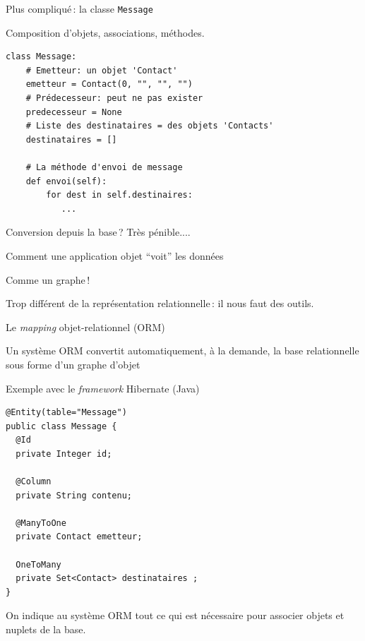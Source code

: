 \begin{frame}[fragile]{Plus compliqué\,: la classe  \texttt{Message}}

Composition d'objets,  associations, méthodes.

\vfill

\vfill

\begin{verbatim}
class Message:
    # Emetteur: un objet 'Contact'
    emetteur = Contact(0, "", "", "")
    # Prédecesseur: peut ne pas exister
    predecesseur = None
    # Liste des destinataires = des objets 'Contacts'
    destinataires = []

    # La méthode d'envoi de message
    def envoi(self):
        for dest in self.destinaires:
           ...
\end{verbatim}

\vfill

Conversion depuis la base\,? Très pénible....
\end{frame}

\begin{frame}{Comment une application objet ``voit'' les données}

Comme un graphe\,!

\vfill

\vfill


\vfill
Trop différent de la représentation relationnelle\,: il nous faut des outils.

\end{frame}


\begin{frame}{Le \textit{mapping} objet-relationnel (ORM)}

Un système ORM convertit \alert{automatiquement}, 
\alert{à la demande}, la base relationnelle sous forme d’un graphe d’objet

\vfill


\end{frame}

\begin{frame}[fragile]{Exemple avec le \textit{framework} Hibernate (Java)}

\begin{verbatim}
@Entity(table="Message")
public class Message {
  @Id
  private Integer id;
  
  @Column
  private String contenu;
  
  @ManyToOne
  private Contact emetteur;
  
  OneToMany
  private Set<Contact> destinataires ;
}
\end{verbatim}


\vfill

On indique au système ORM tout ce qui est nécessaire pour associer
objets et nuplets de la base.

\end{frame}


